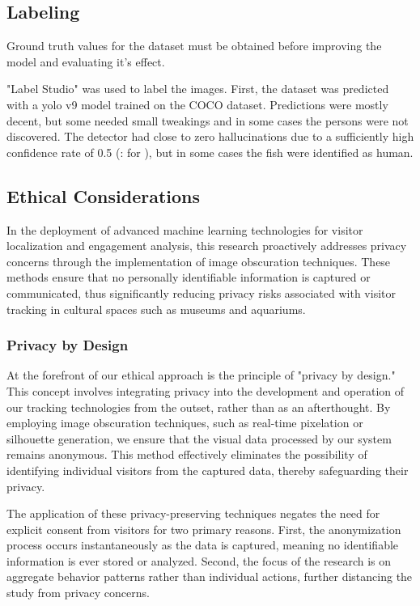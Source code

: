 \subsection{Labeling}
\label{sec:labeling}
Ground truth values for the dataset must be obtained before improving the model and evaluating it's effect. 

"Label Studio" was used to label the images. First, the dataset was predicted with a yolo v9 model trained on the COCO dataset. Predictions were mostly decent, but some needed small tweakings and in some cases the persons were not discovered. The detector had close to zero hallucinations due to a sufficiently high confidence rate of 0.5 (: for ), but in some cases the fish were identified as human.

\subsection{Ethical Considerations}
In the deployment of advanced machine learning technologies for visitor localization and engagement analysis, this research proactively addresses privacy concerns through the implementation of image obscuration techniques. These methods ensure that no personally identifiable information is captured or communicated, thus significantly reducing privacy risks associated with visitor tracking in cultural spaces such as museums and aquariums.

\subsubsection{Privacy by Design}
At the forefront of our ethical approach is the principle of "privacy by design." This concept involves integrating privacy into the development and operation of our tracking technologies from the outset, rather than as an afterthought. By employing image obscuration techniques, such as real-time pixelation or silhouette generation, we ensure that the visual data processed by our system remains anonymous. This method effectively eliminates the possibility of identifying individual visitors from the captured data, thereby safeguarding their privacy.

The application of these privacy-preserving techniques negates the need for explicit consent from visitors for two primary reasons. First, the anonymization process occurs instantaneously as the data is captured, meaning no identifiable information is ever stored or analyzed. Second, the focus of the research is on aggregate behavior patterns rather than individual actions, further distancing the study from privacy concerns.


